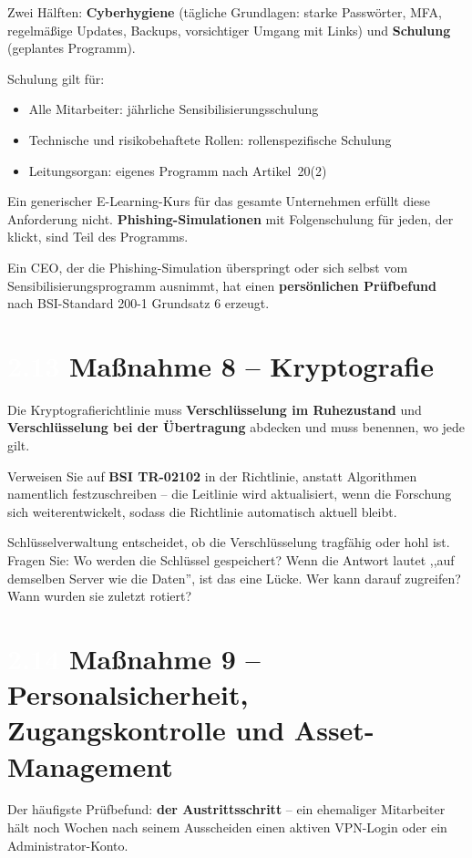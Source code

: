 \documentclass[11pt,a4paper,twoside]{book}
\newcommand{\lessontag}[1]{%
  \texorpdfstring{%
    \setlength{\fboxsep}{3pt}\colorbox{nisd2blue}{\textcolor{white}{\footnotesize\bfseries #1}}\quad%
  }{Lektion #1\ }%
}
\begin{document}
Zwei Hälften: \textbf{Cyberhygiene} (tägliche Grundlagen: starke Passwörter, MFA, regelmäßige Updates, Backups, vorsichtiger Umgang mit Links) und \textbf{Schulung} (geplantes Programm).

Schulung gilt für:
\begin{itemize}
  \item Alle Mitarbeiter: jährliche Sensibilisierungsschulung
  \item Technische und risikobehaftete Rollen: rollenspezifische Schulung
  \item Leitungsorgan: eigenes Programm nach Artikel~20(2)
\end{itemize}

Ein generischer E-Learning-Kurs für das gesamte Unternehmen erfüllt diese Anforderung nicht. \textbf{Phishing-Simulationen} mit Folgenschulung für jeden, der klickt, sind Teil des Programms.

Ein CEO, der die Phishing-Simulation überspringt oder sich selbst vom Sensibilisierungsprogramm ausnimmt, hat einen \textbf{persönlichen Prüfbefund} nach BSI-Standard 200-1 Grundsatz 6 erzeugt.

\section{\lessontag{2.13}Maßnahme 8 -- Kryptografie}

Die Kryptografierichtlinie muss \textbf{Verschlüsselung im Ruhezustand} und \textbf{Verschlüsselung bei der Übertragung} abdecken und muss benennen, wo jede gilt.

Verweisen Sie auf \textbf{BSI TR-02102} in der Richtlinie, anstatt Algorithmen namentlich festzuschreiben -- die Leitlinie wird aktualisiert, wenn die Forschung sich weiterentwickelt, sodass die Richtlinie automatisch aktuell bleibt.

Schlüsselverwaltung entscheidet, ob die Verschlüsselung tragfähig oder hohl ist. Fragen Sie: Wo werden die Schlüssel gespeichert? Wenn die Antwort lautet ,,auf demselben Server wie die Daten'', ist das eine Lücke. Wer kann darauf zugreifen? Wann wurden sie zuletzt rotiert?

\section{\lessontag{2.14}Maßnahme 9 -- Personalsicherheit, Zugangskontrolle und Asset-Management}

Der häufigste Prüfbefund: \textbf{der Austrittsschritt} -- ein ehemaliger Mitarbeiter hält noch Wochen nach seinem Ausscheiden einen aktiven VPN-Login oder ein Administrator-Konto.
\end{document}
